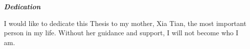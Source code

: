 \begin{center}
\textbf{\textit{Dedication}}
\end{center}

I would like to dedicate this Thesis to my mother, Xia Tian, the most important person in my life. 
Without her guidance and support, I will not become who I am.

